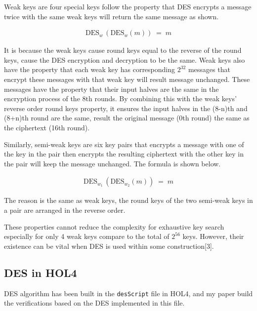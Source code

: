 \documentclass{article}
\begin{document}
Weak keys are four special keys follow the property that DES encrypts a message twice with the same weak keys will return
the same message as shown.

\begin{equation*}
\begin{split}
   \text{DES}_{w} \, (\text{DES}_{w}(m)) \;= \;m
\end{split}
\end{equation*}

It is because the weak keys cause round keys equal to  the reverse of
the round keys, cause the DES encryption and decryption to be the same. Weak keys also have the property that each weak key
has corresponding $2^{32}$ messages that encrypt these messages with that weak key will result message unchanged. These messages
have the property that their input halves are the same in the encryption process of the 8th rounds. By combining this with the weak keys' reverse
order round keys property, it ensures the input halves in the (8-n)th and (8+n)th round are the same, result the original message (0th round) the same
as the ciphertext (16th round).

Similarly, semi-weak keys are six key pairs that encrypts a message with one of the key in the pair then encrypts the resulting
ciphertext with the other key in the pair will keep the message unchanged. The formula is shown below.

\begin{equation*}
\begin{split}
   \text{DES}_{w_{1}} \, (\text{DES}_{w_{2}}(m)) \;= \;m
\end{split}
\end{equation*}

The reason
is the same as weak keys, the round keys of the two semi-weak keys in a pair are arranged in the reverse order.

These properties cannot reduce the complexity for exhaustive key search especially for only 4 weak keys compare to the total
of $2^{56}$ keys. However, their existence can be vital when DES is used within some construction[3].

\subsection{DES in HOL4}
DES algorithm has been built in the \verb|desScript| file in HOL4, and my paper build the verifications based on the DES implemented
in this file.
\end{document}
